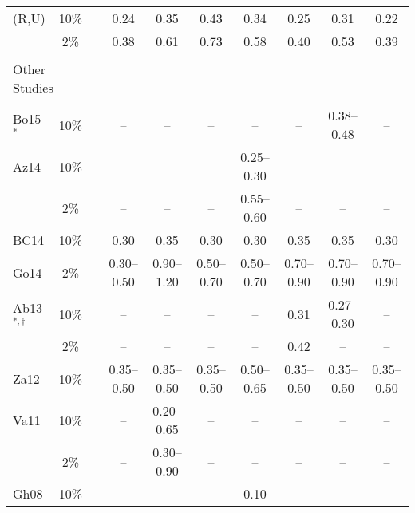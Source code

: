 \begin{table*}[t]
\begin{tabular}{lccccccccc}
    (R,U)   &  10\%  &&   0.24      &   0.35      &   0.43      &   0.34      &   0.25      &   0.31      &   0.22      \\
            &   2\%  &&   0.38      &   0.61      &   0.73      &   0.58      &   0.40      &   0.53      &   0.39      \\
    \hline                                                                                                              \\[-1.6ex]
    \multicolumn{2}{l}{Other Studies}                                                                                   \\[0.6ex]
    \cline{1-2} \cline{4-10}                                                                                            \\[-1.6ex]
    Bo15${}^{*}$
            &  10\%  &&   --        &   --        &   --        &   --        &   --        & 0.38--0.48  &   --        \\
    Az14    &  10\%  &&   --        &   --        &   --        & 0.25--0.30  &   --        &     --      &   --        \\
            &   2\%  &&   --        &   --        &   --        & 0.55--0.60  &   --        &     --      &   --        \\
    BC14    &  10\%  &&   0.30      &   0.35      &   0.30      &   0.30      &   0.35      &   0.35      &   0.30      \\
    Go14    &   2\%  && 0.30--0.50  & 0.90--1.20  & 0.50--0.70  & 0.50--0.70  & 0.70--0.90  & 0.70--0.90  & 0.70--0.90  \\
    Ab13${}^{*,\dagger}$
            &  10\%  &&   --        &   --        &   --        &   --        &   0.31      & 0.27--0.30  &   --        \\
            &   2\%  &&   --        &   --        &   --        &   --        &   0.42      &     --      &   --        \\
    Za12    &  10\%  && 0.35--0.50  & 0.35--0.50  & 0.35--0.50  & 0.50--0.65  & 0.35--0.50  & 0.35--0.50  & 0.35--0.50  \\
    Va11    &  10\%  &&   --        & 0.20--0.65  &   --        &   --        &   --        &     --      &     --      \\
            &   2\%  &&   --        & 0.30--0.90  &   --        &   --        &   --        &     --      &     --      \\
    Gh08    &  10\%  &&   --        &   --        &   --        &   0.10      &   --        &     --      &     --      \\

\end{tabular}
\end{table*}
